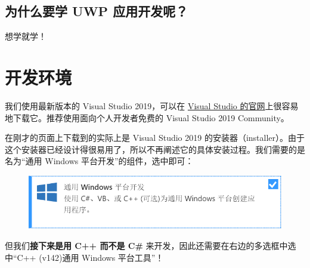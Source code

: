 \subsection{为什么要学 UWP 应用开发呢？}

想学就学！

\section{开发环境}

我们使用最新版本的 Visual Studio 2019，可以在 \href{https://visualstudio.microsoft.com/zh-hans/vs/}{Visual Studio 的官网}上很容易地下载它。推荐使用面向个人开发者免费的 Visual Studio 2019 Community。

在刚才的页面上下载到的实际上是 Visual Studio 2019 的安装器（installer）。由于这个安装器已经设计得很易用了，所以不再阐述它的具体安装过程。我们需要的是名为``通用 Windows 平台开发''的组件，选中即可：

\begin{figure}[htbp]
    \centering
    \includegraphics[width = 0.5\paperwidth]{pic/1.png}
\end{figure}

但我们\textbf{接下来是用 C++ 而不是 C\# }来开发，因此还需要在右边的多选框中选中``C++ (v142)通用 Windows 平台工具''！